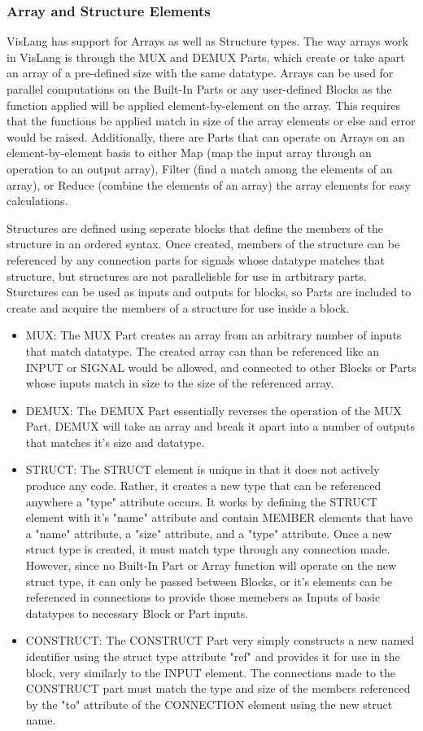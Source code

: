 \documentclass[titlepage]{article}
\begin{document}
\subsubsection{Array and Structure Elements}
VisLang has support for Arrays as well as Structure types.
The way arrays work in VisLang is through the MUX and DEMUX Parts, which create or take apart an array of a pre-defined size with the same datatype.
Arrays can be used for parallel computations on the Built-In Parts or any user-defined Blocks as the function applied will be applied element-by-element on the array.
This requires that the functions be applied match in size of the array elements or else and error would be raised.
Additionally, there are Parts that can operate on Arrays on an element-by-element basis to either Map (map the input array through an operation to an output array), Filter (find a match among the elements of an array), or Reduce (combine the elements of an array) the array elements for easy calculations.
\par
Structures are defined using seperate blocks that define the members of the structure in an ordered syntax.
Once created, members of the structure can be referenced by any connection parts for signals whose datatype matches that structure, but structures are not parallelisble for use in artbitrary parts.
Sturctures can be used as inputs and outputs for blocks, so Parts are included to create and acquire the members of a structure for use inside a block.
\begin{itemize}[label={}]
    \item MUX:
The MUX Part creates an array from an arbitrary number of inputs that match datatype.
The created array can than be referenced like an INPUT or SIGNAL would be allowed, and connected to other Blocks or Parts whose inputs match in size to the size of the referenced array.
    \item DEMUX:
The DEMUX Part essentially reverses the operation of the MUX Part.
DEMUX will take an array and break it apart into a number of outputs that matches it's size and datatype.
    \item STRUCT:
The STRUCT element is unique in that it does not actively produce any code.
Rather, it creates a new type that can be referenced anywhere a "type" attribute occurs.
It works by defining the STRUCT element with it's "name" attribute and contain MEMBER elements that have a "name" attribute, a "size" attribute, and a "type" attribute.
Once a new struct type is created, it must match type through any connection made.
However, since no Built-In Part or Array function will operate on the new struct type, it can only be passed between Blocks, or it's elements can be referenced in connections to provide those memebers as Inputs of basic datatypes to necessary Block or Part inputs.
    \item CONSTRUCT:
The CONSTRUCT Part very simply constructs a new named identifier using the struct type  attribute "ref" and provides it for use in the block, very similarly to the INPUT element.
The connections made to the CONSTRUCT part must match the type and size of the members referenced by the "to" attribute of the CONNECTION element using the new struct name.
\end{itemize}
\end{document}
